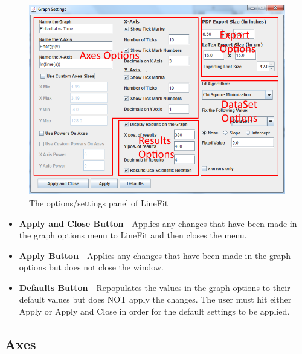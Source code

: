 \documentclass[titlepage,12pt]{article}
\begin{document}
\begin{figure}[ht!]
\centering
\includegraphics[width=15cm]{images/lineFitOptions.png}
\caption{The options/settings panel of LineFit}
\end{figure}

\begin{itemize}
\item \textbf{Apply and Close Button} - Applies any changes that have been made in the graph options menu to LineFit and then closes the menu.
\item \textbf{Apply Button} - Applies any changes that have been made in the graph options but does not close the window.
\item \textbf{Defaults Button} - Repopulates the values in the graph options to their default values but does NOT apply the changes. The user must hit either Apply or Apply and Close in order for the default settings to be applied.
\end{itemize}



\subsection{Axes}
\label{subsec:axes}
\end{document}
